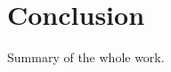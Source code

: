 \documentclass[main.tex]{subfiles}
\begin{document}
    \section{Conclusion}\label{sec:conclusion}
    Summary of the whole work.
\end{document}
